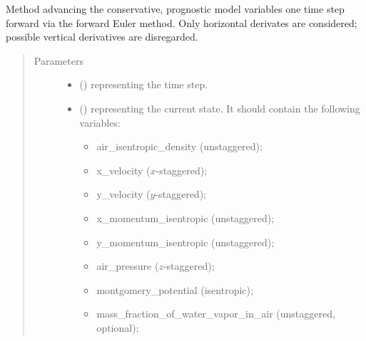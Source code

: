 \documentclass[letterpaper,10pt,english]{sphinxmanual}
\begin{document}
\begin{fulllineitems}
\begin{fulllineitems}
\end{fulllineitems}


\begin{fulllineitems}
\label{\detokenize{api:dycore.prognostic_isentropic_forward_euler.PrognosticIsentropicForwardEuler.step_neglecting_vertical_advection}}
Method advancing the conservative, prognostic model variables one time step forward via the forward Euler method.
Only horizontal derivates are considered; possible vertical derivatives are disregarded.
\begin{quote}\begin{description}
\item[{Parameters}] \leavevmode\begin{itemize}
\item {} 
 () \textendash{}  representing the time step.

\item {} 
 () \textendash{} 
{\hyperref[\detokenize{api:storages.state_isentropic.StateIsentropic}]{}} representing the current state.
It should contain the following variables:
\begin{itemize}
\item {} 
air\_isentropic\_density (unstaggered);

\item {} 
x\_velocity (\(x\)-staggered);

\item {} 
y\_velocity (\(y\)-staggered);

\item {} 
x\_momentum\_isentropic (unstaggered);

\item {} 
y\_momentum\_isentropic (unstaggered);

\item {} 
air\_pressure (\(z\)-staggered);

\item {} 
montgomery\_potential (isentropic);

\item {} 
mass\_fraction\_of\_water\_vapor\_in\_air (unstaggered, optional);


\end{itemize}
\end{itemize}
\end{description}
\end{quote}
\end{fulllineitems}
\end{fulllineitems}
\end{document}
